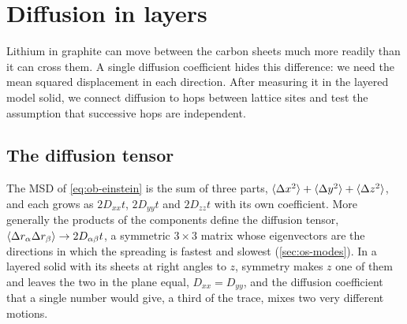 \section{Diffusion in layers}
\label{sec:ob-layers}

Lithium in graphite can move between the carbon sheets much more readily
than it can cross them. A single diffusion coefficient hides this
difference: we need the mean squared displacement in each direction.
After measuring it in the layered model solid, we connect diffusion to
hops between lattice sites and test the assumption that successive hops
are independent.

\subsection*{The diffusion tensor}

The MSD of \cref{eq:ob-einstein} is the sum of three parts, $\langle \Delta
x^2 \rangle + \langle \Delta y^2 \rangle + \langle \Delta z^2 \rangle$, and each grows as $2D_{xx}t$,
$2D_{yy}t$ and $2D_{zz}t$ with its own coefficient. More generally the
products of the components define the diffusion tensor, $\langle \Delta
r_\alpha\Delta r_\beta \rangle \to 2D_{\alpha\beta}t$, a symmetric $3\times3$
matrix whose eigenvectors are the directions in which the spreading is
fastest and slowest (\cref{sec:os-modes}). In a layered solid with its
sheets at right angles to $z$, symmetry makes $z$ one of them and leaves
the two in the plane equal, $D_{xx} = D_{yy}$, and the diffusion
coefficient that a single number would give, a third of the trace,
mixes two very different motions.

